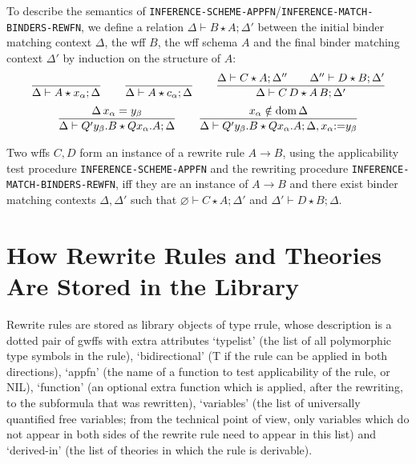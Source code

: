 To describe the semantics of
\texttt{INFERENCE-SCHEME-APPFN}/\texttt{INFERENCE-MATCH-BINDERS-REWFN}, we
define a relation $\Delta\vdash B\star A;\Delta'$ between the initial binder
matching context $\Delta$, the wff $B$, the wff schema $A$ and the final
binder matching context $\Delta'$ by induction on the structure of $A$:
\[
\frac{~}{\Delta\vdash A\star x_{\alpha};\Delta}
\qquad
\frac{~}{\Delta\vdash A\star c_{\alpha};\Delta}
\qquad
\frac{\Delta\vdash C\star A;\Delta''\qquad\Delta''\vdash D\star B;\Delta'}
     {\Delta\vdash C\,D\star A\,B;\Delta'}
\]\[
\frac{\Delta\,x_{\alpha}=y_{\beta}}
     {\Delta\vdash Q'y_{\beta}.B\star Qx_{\alpha}.A;\Delta}
\qquad
\frac{x_{\alpha}\notin\textup{dom}\,\Delta}
     {\Delta\vdash Q'y_{\beta}.B\star Qx_{\alpha}.A;
      \Delta,x_{\alpha}{:=}y_{\beta}}
\]

Two wffs $C,D$ form an instance of a rewrite rule $A\longrightarrow B$, using
the applicability test procedure \linebreak \texttt{INFERENCE-SCHEME-APPFN}
and the rewriting procedure \texttt{INFERENCE-MATCH-BINDERS-REWFN}, iff they
are an instance of $A\longrightarrow B$ and there exist binder matching
contexts $\Delta,\Delta'$ such that $\varnothing\vdash C\star A;\Delta'$ and
$\Delta'\vdash D\star B;\Delta$.

\section{How Rewrite Rules and Theories Are Stored in the Library}
Rewrite rules are stored as library objects of type
rrule, whose description is a dotted pair of gwffs with extra attributes
`typelist' (the list of all polymorphic type symbols in the rule),
`bidirectional' (T if the rule can be applied in both directions),
`appfn' (the name of a function to test applicability of the rule, or NIL),
`function' (an optional extra function which is applied, after the
rewriting, to the subformula that was rewritten),
`variables' (the list of universally quantified free variables; from the
technical point of view, only variables which do not appear in both sides
of the rewrite rule need to appear in this list) and
`derived-in' (the list of theories in which the rule is derivable).



